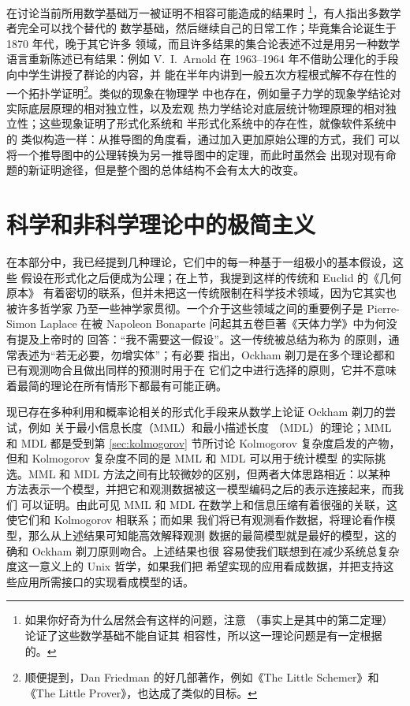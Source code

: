 在讨论当前所用数学基础万一被证明不相容可能造成的结果时%
\footnote{如果你好奇为什么居然会有这样的问题，注意 %
（事实上是其中的第二定理）论证了这些数学基础不能自证其
相容性，所以这一理论问题是有一定根据的。}，有人指出多数学者完全可以找个替代的
数学基础，然后继续自己的日常工作；毕竟集合论诞生于 1870 年代，晚于其它许多
领域，而且许多结果的集合论表述不过是用另一种数学语言重新陈述已有结果：例如
V.\ I.\ Arnold 在 1963--1964 年不借助公理化的手段向中学生讲授了群论的内容，并
能在半年内讲到一般五次方程根式解不存在性的一个拓扑学证明\footnote{顺便提到，Dan Friedman 的好几部著作，例如《The Little
Schemer》和《The Little Prover》，也达成了类似的目标。}。类似的现象在物理学
中也存在，例如量子力学的现象学结论对实际底层原理的相对独立性，以及宏观
热力学结论对底层统计物理原理的相对独立性；这些现象证明了形式化系统和
半形式化系统中的存在性，就像软件系统中的
类似构造一样：从推导图的角度看，通过加入更加原始公理的方式，我们
可以将一个推导图中的公理转换为另一推导图中的定理，而此时虽然会
出现对现有命题的新证明途径，但是整个图的总体结构不会有太大的改变。

\section{科学和非科学理论中的极简主义}\label{sec:ockham}

在本部分中，我已经提到几种理论，它们中的每一种基于一组极小的基本假设，这些
假设在形式化之后便成为公理；在上节，我提到这样的传统和 Euclid 的《几何原本》
有着密切的联系，但并未把这一传统限制在科学技术领域，因为它其实也被许多哲学家
乃至一些神学家贯彻。一个介于这些领域之间的重要例子是 Pierre-Simon Laplace
在被 Napoleon Bonaparte 问起其五卷巨著《天体力学》中为何没有提及上帝时的
回答：“我不需要这一假设”。这一传统被总结为称为 %
的原则，通常表述为“若无必要，勿增实体”；有必要
指出，Ockham 剃刀是在多个理论都和已有观测吻合且做出同样的预测时用于在
它们之中进行选择的原则，它并不意味着最简的理论在所有情形下都最有可能正确。

现已存在多种利用和概率论相关的形式化手段来从数学上论证 Ockham 剃刀的尝试，例如
关于最小信息长度（MML）和最小描述长度%
（MDL）的理论；MML 和 MDL 都是受到第 \ref{sec:kolmogorov} 节所讨论 Kolmogorov
复杂度启发的产物，但和 Kolmogorov 复杂度不同的是 MML 和 MDL 可以用于统计模型
的实际挑选。MML 和 MDL 方法之间有比较微妙的区别，但两者大体思路相近：以某种
方法表示一个模型，并把它和观测数据被这一模型编码之后的表示连接起来，而我们
可以证明。由此可见 MML 和
MDL 在数学上和信息压缩有着很强的关联，这使它们和 Kolmogorov 相联系；而如果
我们将已有观测看作数据，将理论看作模型，那么从上述结果可知能高效解释观测
数据的最简模型就是最好的模型，这的确和 Ockham 剃刀原则吻合。上述结果也很
容易使我们联想到在减少系统总复杂度这一意义上的 Unix 哲学，如果我们把
希望实现的应用看成数据，并把支持这些应用所需接口的实现看成模型的话。

